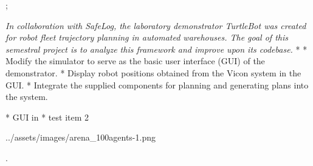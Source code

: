 

\worktype[B/EN]
\slideshow



\pg;


\textit {
    In collaboration with SafeLog, the laboratory demonstrator TurtleBot was created
    for robot fleet trajectory planning in automated warehouses. The goal of this semestral
    project is to analyze this framework and improve upon its codebase.
}
\begitems
* 
* Modify the simulator to serve as the basic user interface (GUI) of the demonstrator.
* Display robot positions obtained from the Vicon system in the GUI.
* Integrate the supplied components for planning and generating plans into the system.
\enditems
\nl


\begitems
* GUI in 
* test item 2
\enditems
\nl

\centerline{\picw=14cm \inspic ../assets/images/arena_100agents-1.png }


\pg.